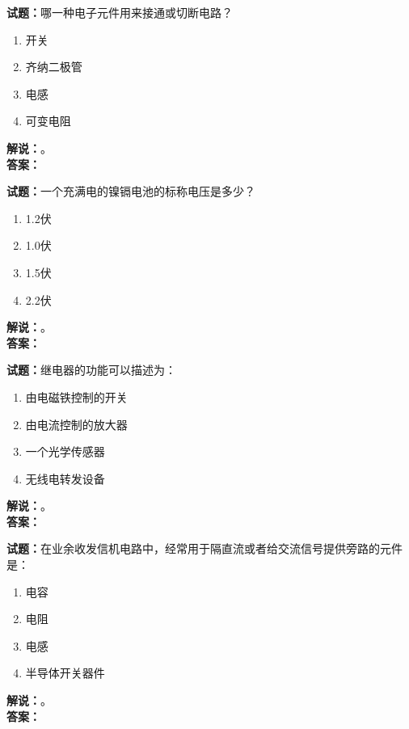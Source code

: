 \documentclass{ctexbook}
\begin{document}
\noindent\textbf{试题：}哪一种电子元件用来接通或切断电路？
\begin{enumerate}[leftmargin=3em]
\item 开关
\item 齐纳二极管
\item 电感
\item 可变电阻
\end{enumerate}
\noindent\textbf{解说：}\textbf{}。\\\noindent\textbf{答案：}

\bigskip




\noindent\textbf{试题：}一个充满电的镍镉电池的标称电压是多少？
\begin{enumerate}[leftmargin=3em]
\item 1.2伏
\item 1.0伏
\item 1.5伏
\item 2.2伏
\end{enumerate}
\noindent\textbf{解说：}\textbf{}。\\\noindent\textbf{答案：}

\bigskip




\noindent\textbf{试题：}继电器的功能可以描述为：
\begin{enumerate}[leftmargin=3em]
\item 由电磁铁控制的开关
\item 由电流控制的放大器
\item 一个光学传感器
\item 无线电转发设备
\end{enumerate}
\noindent\textbf{解说：}\textbf{}。\\\noindent\textbf{答案：}

\bigskip




\noindent\textbf{试题：}在业余收发信机电路中，经常用于隔直流或者给交流信号提供旁路的元件是：
\begin{enumerate}[leftmargin=3em]
\item 电容
\item 电阻
\item 电感
\item 半导体开关器件
\end{enumerate}
\noindent\textbf{解说：}\textbf{}。\\\noindent\textbf{答案：}

\bigskip
\end{document}

